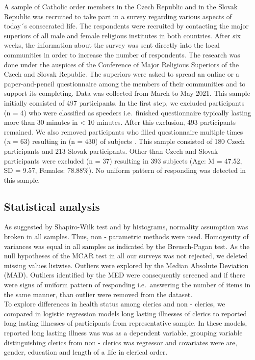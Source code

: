 \documentclass[ijerph,article,accept,moreauthors,pdftex]{mdpi}
\begin{document}
A sample of Catholic order members in the Czech Republic and in the
Slovak Republic was recruited to take part in a survey regarding various
aspects of today´s consecrated life. The respondents were recruited by
contacting the major superiors of all male and female religious
institutes in both countries. After six weeks, the information about the
survey was sent directly into the local communities in order to increase
the number of respondents. The research was done under the auspices of
the Conference of Major Religious Superiors of the Czech and Slovak
Republic. The superiors were asked to spread an online or a
paper-and-pencil questionnaire among the members of their communities
and to support its completing. Data was collected from March to May
2021. This sample initially consisted of 497 participants. In the first
step, we excluded participants (n = 4) who were classified as speeders
i.e.~finished questionnaire typically lasting more than 30 minutes in
\textless{} 10 minutes. After this exclusion, 493 participants remained.
We also removed participants who filled questionnaire multiple times
(\emph{n} = 63) resulting in (n = 430) of subjects . This sample
consisted of 180 Czech participants and 213 Slovak participants. Other
than Czech and Slovak participants were excluded (n = 37) resulting in
393 subjects (Age: M = 47.52, SD = 9.57, Females: 78.88\%). No uniform
pattern of responding was detected in this sample.

\hypertarget{statistical-analysis}{%
\subsection{Statistical analysis}\label{statistical-analysis}}

As suggested by Shapiro-Wilk test and by histograms, normality
assumption was broken in all samples. Thus, non - parametric methods
were used. Homogenity of variances was equal in all samples as indicated
by the Breusch-Pagan test. As the null hypotheses of the MCAR test in
all our surveys was not rejected, we deleted missing values listwise.
Outliers were explored by the Median Absolute Deviation (MAD). Outliers
identified by the MED were consequently screened and if there were signs
of uniform pattern of responding i.e.~answering the number of items in
the same manner, than outlier were removed from the dataset.\\
To explore differences in health status among clerics and non - clerics,
we compared in logistic regression models long lasting illnesses of
clerics to reported long lasting illnesses of participants from
representative sample. In these models, reported long lasting illness
was was as a dependent variable, grouping variable distinguishing
clerics from non - clerics was regressor and covariates were are,
gender, education and length of a life in clerical order.
\end{document}
